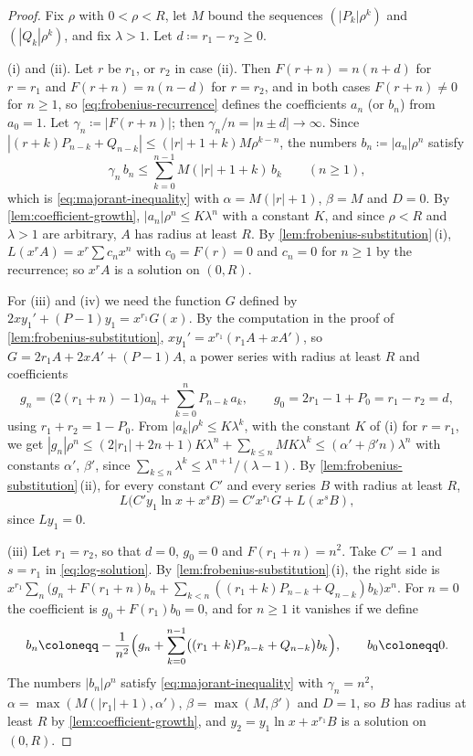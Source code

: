 \begin{proof}
Fix $\rho$ with $0<\rho<R$, let $M$ bound the sequences $(|P_k|\rho^k)$ and $(|Q_k|\rho^k)$, and fix $\lambda>1$. Let $d\coloneqq r_1-r_2\ge0$.

(i) and (ii). Let $r$ be $r_1$, or $r_2$ in case (ii). Then $F(r+n)=n(n+d)$ for $r=r_1$ and $F(r+n)=n(n-d)$ for $r=r_2$, and in both cases $F(r+n)\ne0$ for $n\ge1$, so \eqref{eq:frobenius-recurrence} defines the coefficients $a_n$ (or $b_n$) from $a_0=1$. Let $\gamma_n\coloneqq|F(r+n)|$; then $\gamma_n/n=|n\pm d|\to\infty$. Since $|(r+k)P_{n-k}+Q_{n-k}|\le(|r|+1+k)M\rho^{k-n}$, the numbers $b_n\coloneqq|a_n|\rho^n$ satisfy
\[
\gamma_n\,b_n\le\sum_{k=0}^{n-1}M(|r|+1+k)\,b_k\qquad(n\ge1),
\]
which is \eqref{eq:majorant-inequality} with $\alpha=M(|r|+1)$, $\beta=M$ and $D=0$. By \cref{lem:coefficient-growth}, $|a_n|\rho^n\le K\lambda^n$ with a constant $K$, and since $\rho<R$ and $\lambda>1$ are arbitrary, $A$ has radius at least $R$. By \cref{lem:frobenius-substitution}\,(i), $L(x^rA)=x^r\sum c_nx^n$ with $c_0=F(r)=0$ and $c_n=0$ for $n\ge1$ by the recurrence; so $x^rA$ is a solution on $(0,R)$.

For (iii) and (iv) we need the function $G$ defined by $2xy_1'+(P-1)y_1=x^{r_1}G(x)$. By the computation in the proof of \cref{lem:frobenius-substitution}, $xy_1'=x^{r_1}(r_1A+xA')$, so $G=2r_1A+2xA'+(P-1)A$, a power series with radius at least $R$ and coefficients
\[
g_n=\bigl(2(r_1+n)-1\bigr)a_n+\sum_{k=0}^nP_{n-k}\,a_k ,\qquad g_0=2r_1-1+P_0=r_1-r_2=d,
\]
using $r_1+r_2=1-P_0$. From $|a_k|\rho^k\le K\lambda^k$, with the constant $K$ of (i) for $r=r_1$, we get $|g_n|\rho^n\le(2|r_1|+2n+1)K\lambda^n+\sum_{k\le n}MK\lambda^k\le(\alpha'+\beta'n)\lambda^n$ with constants $\alpha'$, $\beta'$, since $\sum_{k\le n}\lambda^k\le\lambda^{n+1}/(\lambda-1)$. By \cref{lem:frobenius-substitution}\,(ii), for every constant $C'$ and every series $B$ with radius at least $R$,
\begin{equation}
L\bigl(C'y_1\ln x+x^{s}B\bigr)=C'x^{r_1}G+L(x^sB),
\label{eq:log-solution}
\end{equation}
since $Ly_1=0$.

(iii) Let $r_1=r_2$, so that $d=0$, $g_0=0$ and $F(r_1+n)=n^2$. Take $C'=1$ and $s=r_1$ in \eqref{eq:log-solution}. By \cref{lem:frobenius-substitution}\,(i), the right side is $x^{r_1}\sum_n\bigl(g_n+F(r_1+n)b_n+\sum_{k<n}((r_1+k)P_{n-k}+Q_{n-k})b_k\bigr)x^n$. For $n=0$ the coefficient is $g_0+F(r_1)b_0=0$, and for $n\ge1$ it vanishes if we define
\[
b_n\coloneqq-\frac1{n^2}\Bigl(g_n+\sum_{k=0}^{n-1}\bigl((r_1+k)P_{n-k}+Q_{n-k}\bigr)b_k\Bigr),\qquad b_0\coloneqq0 .
\]
The numbers $|b_n|\rho^n$ satisfy \eqref{eq:majorant-inequality} with $\gamma_n=n^2$, $\alpha=\max(M(|r_1|+1),\alpha')$, $\beta=\max(M,\beta')$ and $D=1$, so $B$ has radius at least $R$ by \cref{lem:coefficient-growth}, and $y_2=y_1\ln x+x^{r_1}B$ is a solution on $(0,R)$.


\end{proof}
